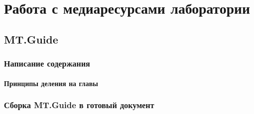 \part[Медиаресурсы лаборатории]{Работа с медиаресурсами лаборатории}
\chapter[MT.Guide]{MT.Guide}
\section[Руководство для авторов]{Написание содержания}
\subsection[Деление на главы]{Принципы деления на главы}
\section[Сборка и публикация]{Сборка MT.Guide в готовый документ}

